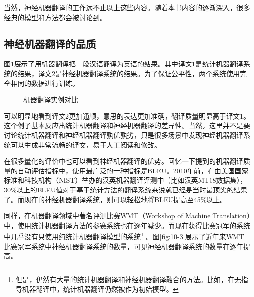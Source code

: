 \parinterval  当然，神经机器翻译的工作远不止以上这些内容。随着本书内容的逐渐深入，很多经典的模型和方法都会被讨论到。

\subsection{神经机器翻译的品质}
\parinterval  图\ref{fig:10-2}展示了用机器翻译把一段汉语翻译为英语的结果。其中译文1是统计机器翻译系统的结果，译文2是神经机器翻译系统的结果。为了保证公平性，两个系统使用完全相同的数据进行训练。

%

\begin{figure}[htp]
\centering

\caption{机器翻译实例对比}
\label{fig:10-2}
\end{figure}

\vspace{-0.3em}
\parinterval  可以明显地看到译文2更加通顺，意思的表达更加准确，翻译质量明显高于译文1。这个例子基本反应出统计机器翻译和神经机器翻译的差异性。当然，这里并不是要讨论统计机器翻译和神经机器翻译孰优孰劣，只是很多场景中发现神经机器翻译系统可以生成非常流畅的译文，易于人工阅读和修改。

\parinterval  在很多量化的评价中也可以看到神经机器翻译的优势。回忆一下{\chapterfour}提到的机器翻译质量的自动评估指标中，使用最广泛的一种指标是BLEU。2010年前，在由美国国家标准和科技机构（NIST）举办的汉英机器翻译评测中（比如汉英MT08数据集），30\%以上的BLEU值对于基于统计方法的翻译系统来说就已经是当时最顶尖的结果了。而现在的神经机器翻译系统，则可以轻松地将BLEU提高至45\%以上。

\parinterval  同样，在机器翻译领域中著名评测比赛WMT（Workshop of Machine Translation）中，使用统计机器翻译方法的参赛系统也在逐年减少。而现在获得比赛冠军的系统中几乎没有只使用纯统计机器翻译模型的系统\footnote{但是，仍然有大量的统计机器翻译和神经机器翻译融合的方法。比如，在无指导机器翻译中，统计机器翻译仍然被作为初始模型。} 。图\ref{fig:10-3}展示了近年来WMT比赛冠军系统中神经机器翻译系统的数量，可见神经机器翻译系统的数量在逐年提高。

